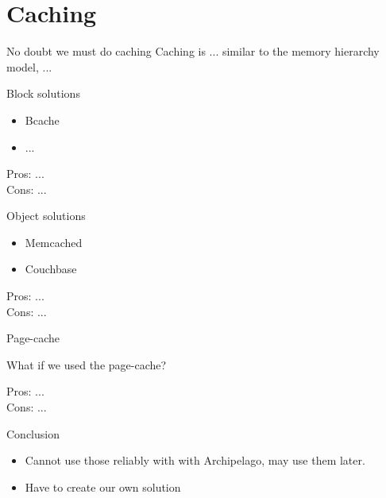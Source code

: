 \section{Caching}

\begin{frame}

	No doubt we must do caching
	Caching is ...
	similar to the memory hierarchy model, ...
\end{frame}

\begin{frame}{Block solutions}

	\begin{itemize}
		\item Bcache
		\item ...
	\end{itemize}

	\dspc
	Pros: ...\\
	Cons: ...\\
\end{frame}

\begin{frame}{Object solutions}
	\begin{itemize}
		\item Memcached
		\item Couchbase
	\end{itemize}

	\dspc
	Pros: ...\\
	Cons: ...\\
\end{frame}

\begin{frame}{Page-cache}

	What if we used the page-cache?

	\dspc
	Pros: ...\\
	Cons: ...\\

\end{frame}

\begin{frame}{Conclusion}

	\begin{itemize}
		\item Cannot use those reliably with with Archipelago, may use 
			them later.
		\item Have to create our own solution
	\end{itemize}
\end{frame}
	
